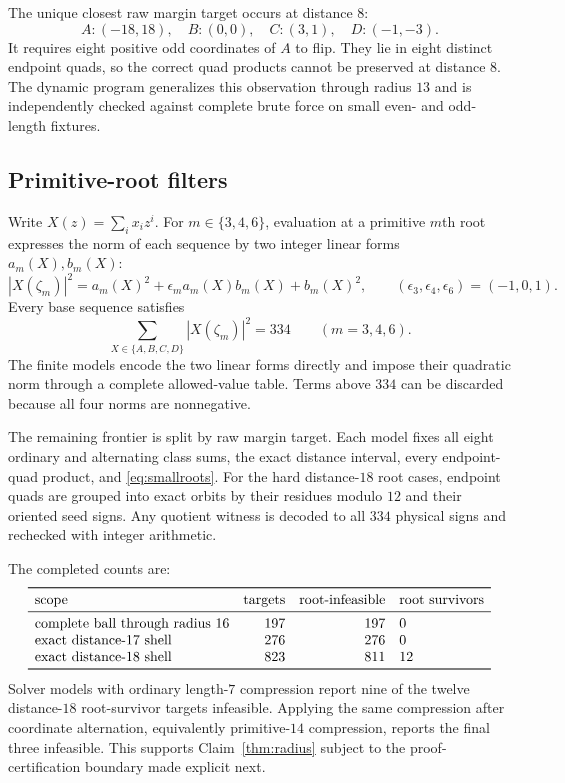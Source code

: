 \documentclass[11pt]{article}
\begin{document}
The unique closest raw margin target occurs at distance $8$:
\[
 A:(-18,18),\quad B:(0,0),\quad C:(3,1),\quad D:(-1,-3).
\]
It requires eight positive odd coordinates of $A$ to flip.  They lie in
eight distinct endpoint quads, so the correct quad products cannot be
preserved at distance $8$.  The dynamic program generalizes this observation
through radius $13$ and is independently checked against complete brute
force on small even- and odd-length fixtures.

\subsection{Primitive-root filters}

Write $X(z)=\sum_i x_i z^i$.  For $m\in\{3,4,6\}$, evaluation at a primitive
$m$th root expresses the norm
of each sequence by two integer linear forms $a_m(X),b_m(X)$:
\[
 |X(\zeta_m)|^2
 =a_m(X)^2+\epsilon_m a_m(X)b_m(X)+b_m(X)^2,
 \qquad
 (\epsilon_3,\epsilon_4,\epsilon_6)=(-1,0,1).
\]
Every base sequence satisfies
\begin{equation}
 \sum_{X\in\{A,B,C,D\}}|X(\zeta_m)|^2=334
 \qquad(m=3,4,6).
 \label{eq:smallroots}
\end{equation}
The finite models encode the two linear forms directly and impose their
quadratic norm through a complete allowed-value table.  Terms above $334$
can be discarded because all four norms are nonnegative.

The remaining frontier is split by raw margin target.  Each model fixes all
eight ordinary and alternating class sums, the exact distance interval, every
endpoint-quad product, and \eqref{eq:smallroots}.  For the hard distance-$18$
root cases, endpoint quads are grouped into exact orbits by their residues
modulo $12$ and their oriented seed signs.  Any quotient witness is decoded
to all $334$ physical signs and rechecked with integer arithmetic.

The completed counts are:
\[
\begin{array}{lrrl}
\toprule
\text{scope}&\text{targets}&\text{root-infeasible}&\text{root survivors}\\
\midrule
\text{complete ball through radius }16&197&197&0\\
\text{exact distance-17 shell}&276&276&0\\
\text{exact distance-18 shell}&823&811&12\\
\bottomrule
\end{array}
\]
Solver models with ordinary length-$7$ compression report nine of the twelve
distance-$18$ root-survivor targets infeasible.  Applying the same compression
after coordinate alternation, equivalently primitive-$14$ compression, reports
the final three infeasible.  This supports Claim~\ref{thm:radius} subject to
the proof-certification boundary made explicit next.
\end{document}
